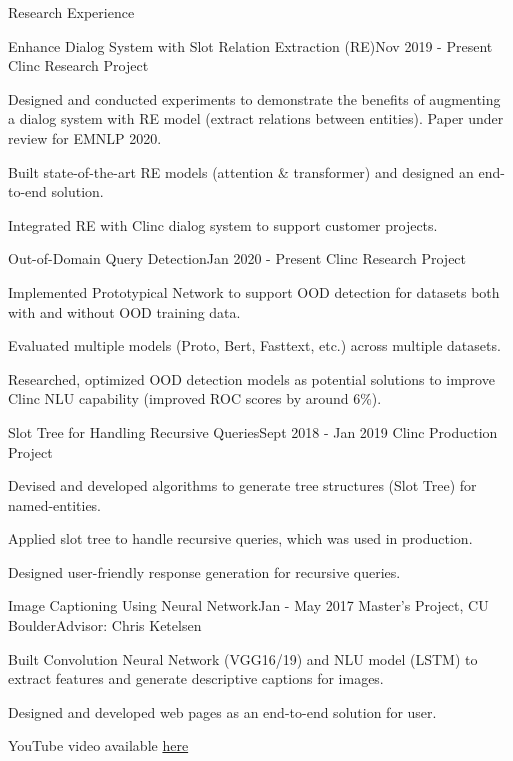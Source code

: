 \documentclass{resume} %
\begin{document}

\begin{rSection}{Research Experience}

\begin{rSubsection}{Enhance Dialog System with Slot Relation Extraction (RE)}{Nov 2019 - Present }{Clinc Research Project}{}
\item Designed and conducted experiments to demonstrate the benefits of augmenting a dialog system with RE model (extract relations between entities). Paper under review for EMNLP 2020.
\item Built state-of-the-art RE models (attention $\&$ transformer) and designed an end-to-end solution.
\item Integrated RE with Clinc dialog system to support customer projects.
\end{rSubsection}

\begin{rSubsection}{Out-of-Domain Query Detection}{Jan 2020 - Present }{Clinc Research Project}{}
\item Implemented Prototypical Network to support OOD detection for datasets both with and without OOD training data.
\item Evaluated multiple models (Proto, Bert, Fasttext, etc.) across multiple datasets.
\item Researched, optimized OOD detection models as potential solutions to improve Clinc NLU capability (improved ROC scores by around 6\%).
\end{rSubsection}

\begin{rSubsection}{Slot Tree for Handling Recursive Queries}{Sept 2018 - Jan 2019 }{Clinc Production Project}{}
\item Devised and developed algorithms to generate tree structures (Slot Tree) for named-entities.
\item Applied slot tree to handle recursive queries, which was used in production. 
\item Designed user-friendly response generation for recursive queries.
\end{rSubsection}

\begin{rSubsection}{Image Captioning Using Neural Network}{Jan - May 2017 }{Master's Project, CU Boulder}{Advisor: Chris Ketelsen}
\item Built Convolution Neural Network (VGG16/19) and NLU model (LSTM) to extract features and generate descriptive captions for images.
\item Designed and developed web pages as an end-to-end solution for user.
\item YouTube video available \href{https://www.youtube.com/watch?v=f2waevH1b6I}{here}
\end{rSubsection}


\end{rSection}
\end{document}
